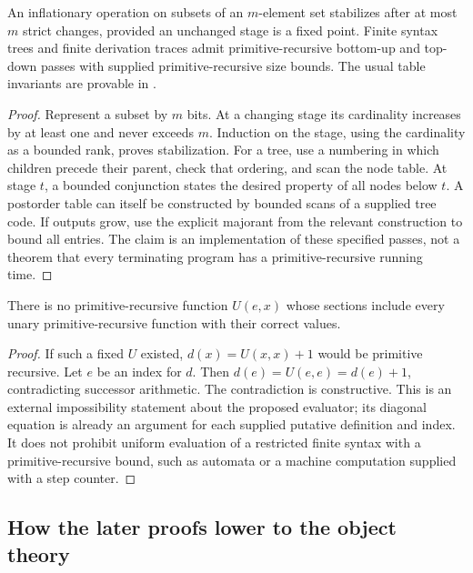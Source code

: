 \begin{lemma}
\label{base:saturation}
An inflationary operation on subsets of an $m$-element set stabilizes after
at most $m$ strict changes, provided an unchanged stage is a fixed point.
Finite syntax trees and finite derivation traces admit primitive-recursive
bottom-up and top-down passes with supplied primitive-recursive size bounds.
The usual table invariants are provable in \ipra.
\end{lemma}
\begin{proof}
Represent a subset by $m$ bits. At a changing stage its cardinality increases
by at least one and never exceeds $m$. Induction on the stage, using the
cardinality as a bounded rank, proves stabilization. For a tree, use a
numbering in which children precede their parent, check that ordering, and
scan the node table. At stage $t$, a bounded conjunction states the desired
property of all nodes below $t$. A postorder table can itself be constructed
by bounded scans of a supplied tree code. If outputs grow, use the explicit
majorant from the relevant construction to bound all entries. The claim is
an implementation of these specified passes, not a theorem that every
terminating program has a primitive-recursive running time.
\end{proof}

\begin{proposition}
\label{base:noeval}
There is no primitive-recursive function $U(e,x)$ whose sections include
every unary primitive-recursive function with their correct values.
\end{proposition}
\begin{proof}
If such a fixed $U$ existed, $d(x)=U(x,x)+1$ would be primitive recursive.
Let $e$ be an index for $d$. Then $d(e)=U(e,e)=d(e)+1$, contradicting
successor arithmetic. The contradiction is constructive. This is an
external impossibility statement about the proposed evaluator; its
diagonal equation is already an \ipra{} argument for each supplied
putative definition and index. It does not prohibit uniform evaluation
of a restricted finite syntax with a primitive-recursive bound, such as
automata or a machine computation supplied with a step counter.
\end{proof}

\subsection{How the later proofs lower to the object theory}


